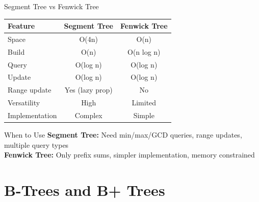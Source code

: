 \documentclass[aspectratio=169,xcolor=dvipsnames]{beamer}
\begin{document}
\begin{frame}{Segment Tree vs Fenwick Tree}
  \begin{table}
    \centering
    \begin{tabular}{l|c|c}
      \toprule
      \textbf{Feature} & \textbf{Segment Tree} & \textbf{Fenwick Tree} \\
      \midrule
      Space & O(4n) & O(n) \\
      Build & O(n) & O(n log n) \\
      Query & O(log n) & O(log n) \\
      Update & O(log n) & O(log n) \\
      Range update & Yes (lazy prop) & No \\
      Versatility & High & Limited \\
      Implementation & Complex & Simple \\
      \bottomrule
    \end{tabular}
  \end{table}

  \vspace{0.3cm}

  \begin{block}{When to Use}
    \textbf{Segment Tree:} Need min/max/GCD queries, range updates, multiple query types \\
    \textbf{Fenwick Tree:} Only prefix sums, simpler implementation, memory constrained
  \end{block}
\end{frame}

\section{B-Trees and B+ Trees}
\end{document}
